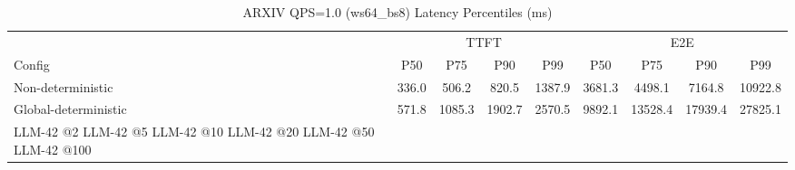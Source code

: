 \begin{table}[htbp]
\centering
\caption{ARXIV QPS=1.0 (ws64_bs8) Latency Percentiles (ms)}
\label{tab:arxiv_qps1.0_ws64_bs8}
\begin{tabular}{l|cccc|cccc}
\toprule
& \multicolumn{4}{c|}{TTFT} & \multicolumn{4}{c}{E2E} \\
Config & P50 & P75 & P90 & P99 & P50 & P75 & P90 & P99 \\
\midrule
Non-deterministic & 336.0 & 506.2 & 820.5 & 1387.9 & 3681.3 & 4498.1 & 7164.8 & 10922.8 \\
Global-deterministic & 571.8 & 1085.3 & 1902.7 & 2570.5 & 9892.1 & 13528.4 & 17939.4 & 27825.1 \\
LLM-42 @2%
LLM-42 @5%
LLM-42 @10%
LLM-42 @20%
LLM-42 @50%
LLM-42 @100%
\bottomrule
\end{tabular}
\end{table}
